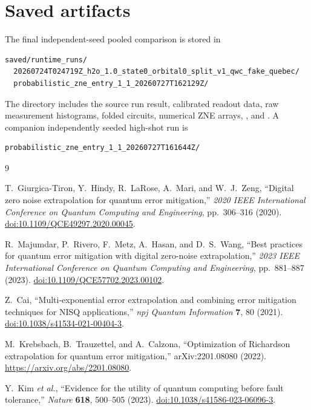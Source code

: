 \documentclass[11pt]{article}
\begin{document}
\section{Saved artifacts}

The final independent-seed pooled comparison is stored in
\begin{verbatim}
saved/runtime_runs/
  20260724T024719Z_h2o_1.0_state0_orbital0_split_v1_qwc_fake_quebec/
  probabilistic_zne_entry_1_1_20260727T162129Z/
\end{verbatim}
The directory includes the source run result, calibrated readout data, raw
measurement histograms, folded circuits, numerical ZNE arrays,
, and
.  A companion independently seeded
high-shot run is
\begin{verbatim}
probabilistic_zne_entry_1_1_20260727T161644Z/
\end{verbatim}

\begin{thebibliography}{9}

T.~Giurgica-Tiron, Y.~Hindy, R.~LaRose, A.~Mari, and W.~J.~Zeng,
``Digital zero noise extrapolation for quantum error mitigation,''
\emph{2020 IEEE International Conference on Quantum Computing and
Engineering}, pp.~306--316 (2020).
\href{https://doi.org/10.1109/QCE49297.2020.00045}
{doi:10.1109/QCE49297.2020.00045}.

R.~Majumdar, P.~Rivero, F.~Metz, A.~Hasan, and D.~S.~Wang,
``Best practices for quantum error mitigation with digital zero-noise
extrapolation,'' \emph{2023 IEEE International Conference on Quantum
Computing and Engineering}, pp.~881--887 (2023).
\href{https://doi.org/10.1109/QCE57702.2023.00102}
{doi:10.1109/QCE57702.2023.00102}.

Z.~Cai,
``Multi-exponential error extrapolation and combining error mitigation
techniques for NISQ applications,'' \emph{npj Quantum Information}
\textbf{7}, 80 (2021).
\href{https://doi.org/10.1038/s41534-021-00404-3}
{doi:10.1038/s41534-021-00404-3}.

M.~Krebsbach, B.~Trauzettel, and A.~Calzona,
``Optimization of Richardson extrapolation for quantum error mitigation,''
arXiv:2201.08080 (2022).
\url{https://arxiv.org/abs/2201.08080}.

Y.~Kim \emph{et al.},
``Evidence for the utility of quantum computing before fault tolerance,''
\emph{Nature} \textbf{618}, 500--505 (2023).
\href{https://doi.org/10.1038/s41586-023-06096-3}
{doi:10.1038/s41586-023-06096-3}.

\end{thebibliography}
\end{document}

